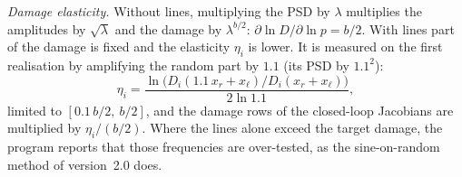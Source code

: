 \emph{Damage elasticity.} Without lines, multiplying the PSD by $\lambda$ multiplies the amplitudes by
$\sqrt\lambda$ and the damage by $\lambda^{b/2}$: $\partial\ln D/\partial\ln p = b/2$. With lines part of
the damage is fixed and the elasticity $\eta_i$ is lower. It is measured on the first realisation by
amplifying the random part by $1.1$ (its PSD by $1.1^2$):
\begin{equation}
  \eta_i = \frac{\ln\bigl(D_i(1.1\,x_r + x_\ell)/D_i(x_r+x_\ell)\bigr)}{2\ln1.1},
\end{equation}
limited to $[0.1\,b/2,\ b/2]$, and the damage rows of the closed-loop Jacobians are multiplied by
$\eta_i/(b/2)$. Where the lines alone exceed the target damage, the program reports that those
frequencies are over-tested, as the sine-on-random method of version~2.0 does.
